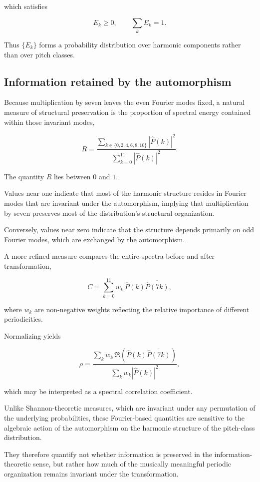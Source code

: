 \documentclass[twoside,onecolumn]{article}
\begin{document}
which satisfies

\[
E_k\ge0,
\qquad
\sum_kE_k=1.
\]

Thus $\{E_k\}$ forms a probability distribution over harmonic components rather than over pitch classes.

\subsection{Information retained by the automorphism}

Because multiplication by seven leaves the even Fourier modes fixed, a natural measure of structural preservation is the proportion of spectral energy contained within those invariant modes,

\[
R
=
\frac{
\sum_{k\in\{0,2,4,6,8,10\}}
|\widehat P(k)|^2
}{
\sum_{k=0}^{11}
|\widehat P(k)|^2
}.
\]

The quantity $R$ lies between $0$ and $1$.

Values near one indicate that most of the harmonic structure resides in Fourier modes that are invariant under the automorphism, implying that multiplication by seven preserves most of the distribution's structural organization.

Conversely, values near zero indicate that the structure depends primarily on odd Fourier modes, which are exchanged by the automorphism.

A more refined measure compares the entire spectra before and after transformation,

\[
C
=
\sum_{k=0}^{11}
w_k
\,
\widehat P(k)
\overline{\widehat P(7k)},
\]

where $w_k$ are non-negative weights reflecting the relative importance of different periodicities.

Normalizing yields

\[
\rho
=
\frac{
\sum_k
w_k
\,
\Re\!\left(
\widehat P(k)
\overline{\widehat P(7k)}
\right)
}{
\sum_k
w_k
|\widehat P(k)|^2
},
\]

which may be interpreted as a spectral correlation coefficient.

Unlike Shannon-theoretic measures, which are invariant under any permutation of the underlying probabilities, these Fourier-based quantities are sensitive to the algebraic action of the automorphism on the harmonic structure of the pitch-class distribution.

They therefore quantify not whether information is preserved in the information-theoretic sense, but rather how much of the musically meaningful periodic organization remains invariant under the transformation.
\end{document}
